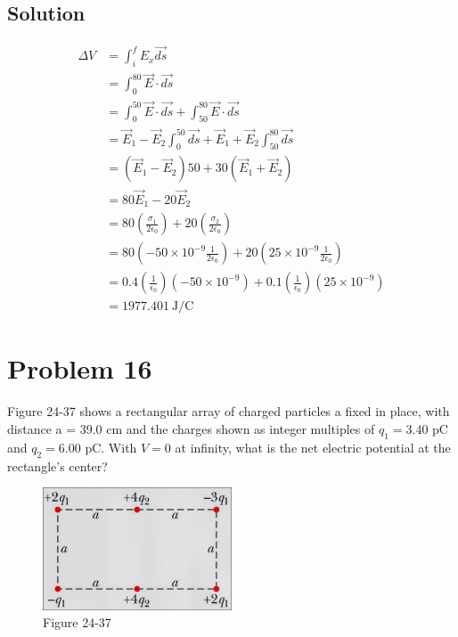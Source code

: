\documentclass{article}
\newcommand{\J}{\text{J}}
\newcommand{\C}{\text{C}}
\begin{document}
\subsection*{Solution}
\begin{align*}
	\Delta V &= \int_i^f E_x \vec{ds} \\
	&= \int_0^{80} \vec{E} \cdot \vec{ds} \\
	&= \int_0^{50} \vec{E} \cdot \vec{ds} + \int_{50}^{80} \vec{E} \cdot \vec{ds} \\
	&= \vec{E}_1 - \vec{E}_2 \int_0^{50} \vec{ds} + \vec{E}_1 + \vec{E}_2 \int_{50}^{80} \vec{ds} \\
	&= \left(\vec{E}_1 - \vec{E}_2\right)50 + 30\left(\vec{E}_1 + \vec{E}_2\right) \\
	&= 80\vec{E}_1 - 20\vec{E}_2 \\
	&= 80\left(\frac{\sigma_1}{2\epsilon_0}\right) + 20\left(\frac{\sigma_2}{2\epsilon_0}\right) \\
	&= 80\left(-50 \times 10^{-9} \frac{1}{2\epsilon_0}\right) + 20\left(25 \times 10^{-9} \frac{1}{2\epsilon_0}\right) \\
	&= 0.4\left(\frac{1}{\epsilon_0}\right) \left(-50 \times 10^{-9}\right) + 0.1\left(\frac{1}{\epsilon_0}\right) \left(25 \times 10^{-9}\right) \\
	&= \boxed{1977.401\ \J/\C}
\end{align*}

\section*{Problem 16}
Figure 24-37 shows a rectangular array of charged particles a fixed in place, with distance a = 39.0 cm and the charges shown as integer multiples of $q_1 = 3.40$ pC and $q_2 = 6.00$ pC. With $V = 0$ at infinity, what is the net electric potential at the rectangle's center?

\begin{figure}[h]
	\centering
	\includegraphics[width=0.5\textwidth]{image-7.png}
	\caption{Figure 24-37}
\end{figure}
\end{document}
